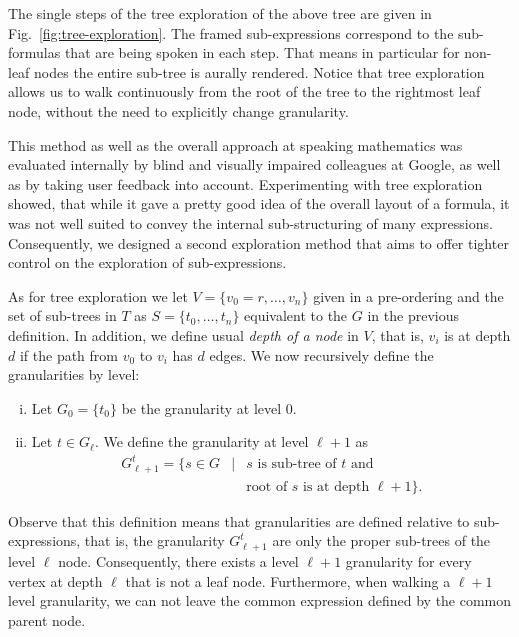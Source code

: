 \documentclass{sig-alternate}
\begin{document}
The single steps of the tree exploration of the above tree are given in
Fig.~\ref{fig:tree-exploration}.  The framed sub-expressions correspond to the
sub-formulas that are being spoken in each step. That means in particular for
non-leaf nodes the entire sub-tree is aurally rendered. Notice that tree
exploration allows us to walk continuously from the root of the tree to the
rightmost leaf node, without the need to explicitly change granularity.

This method as well as the overall approach at speaking mathematics was
evaluated internally by blind and visually impaired colleagues at Google, as
well as by taking user feedback into account.  Experimenting with tree
exploration showed, that while it gave a pretty good idea of the overall layout
of a formula, it was not well suited to convey the internal sub-structuring of
many expressions. Consequently, we designed a second exploration method that
aims to offer tighter control on the exploration of sub-expressions.

As for tree exploration we let $V=\{v_0=r,\ldots,v_n\}$ given in a pre-ordering
and the set of sub-trees in $T$ as $S=\{t_0,\ldots, t_n\}$ equivalent to the $G$
in the previous definition. In addition, we define usual \emph{depth of a node}
in $V$, that is, $v_i$ is at depth $d$ if the path from $v_0$ to $v_i$ has $d$
edges. We now recursively define the granularities by level:
\begin{enumerate}[(i)]
\item Let $G_0=\{t_0\}$ be the granularity at level $0$.
\item Let $t\in G_\ell$. We define the granularity at level $\ell + 1$ as
  \begin{eqnarray*}
    G^t_{\ell+1} = \{s\in G & | & s \mbox{ is sub-tree of } t\mbox{ and }\\ 
    & & \mbox{root of } s \mbox{ is at depth } \ell+1\}.
  \end{eqnarray*}
\end{enumerate}
Observe that this definition means that granularities are defined relative to
sub-expressions, that is, the granularity $G^t_{\ell+1}$ are only the proper
sub-trees of the level $\ell$ node. Consequently, there exists a level $\ell+1$
granularity for every vertex at depth $\ell$ that is not a leaf
node. Furthermore, when walking a $\ell+1$ level granularity, we can not leave
the common expression defined by the common parent node.
\end{document}
